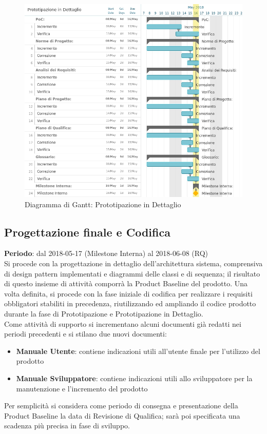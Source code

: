 \begin{figure}[h!]
	\centerline{\includegraphics[scale=0.5]{img/DiagrammiGantt/PrototipazioneDettaglio.jpg}}
	\caption{Diagramma di Gantt: Prototipazione in Dettaglio}
	\label{fig:gantt_prot_dett}
\end{figure}
\clearpage

\subsection{Progettazione finale e Codifica}
\textbf{Periodo}: dal 2018-05-17 (Milestone Interna) al 2018-06-08 (RQ)\\

Si procede con la progettazione in dettaglio dell'architettura sistema, comprensiva di design pattern implementati e diagrammi delle classi e di sequenza; il risultato di questo insieme di attività comporrà la Product Baseline del prodotto. Una volta definita, si procede con la fase iniziale di codifica per realizzare i requisiti obbligatori stabiliti in precedenza, riutilizzando ed ampliando il codice prodotto durante la fase di Prototipazione e Prototipazione in Dettaglio. \\
Come attività di supporto si incrementano alcuni documenti già redatti nei periodi precedenti e si stilano due nuovi documenti:
\begin{itemize}
	\item \textbf{Manuale Utente}: contiene indicazioni utili all'utente finale per l'utilizzo del prodotto
	\item \textbf{Manuale Sviluppatore}: contiene indicazioni utili allo sviluppatore per la manutenzione e l'incremento del prodotto
\end{itemize}
Per semplicità si considera come periodo di consegna e presentazione della Product Baseline la data di Revisione di Qualifica; sarà poi specificata una scadenza più precisa in fase di sviluppo.

